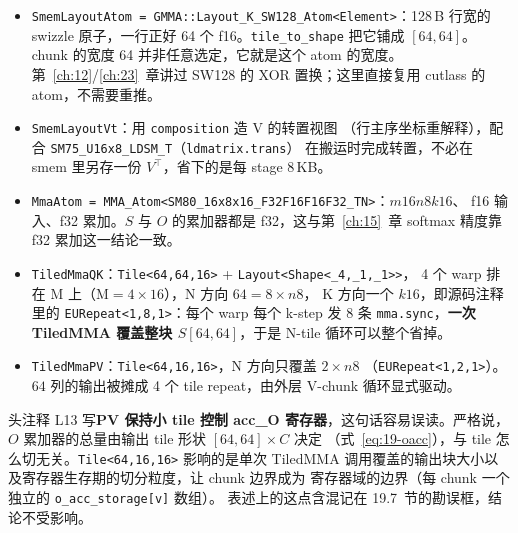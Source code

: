 \begin{itemize}[itemsep=2pt,topsep=2pt]
  \item \texttt{Smem\allowbreak{}Layout\allowbreak{}Atom =\allowbreak{} GMMA::\allowbreak{}Layout\_\allowbreak{}K\_\allowbreak{}SW128\_\allowbreak{}Atom\allowbreak{}<Element>}：128\,B
        行宽的 swizzle 原子，一行正好 64 个 f16。\texttt{tile\_\allowbreak{}to\_\allowbreak{}shape} 把它铺成
        $[64,64]$。chunk 的宽度 64 并非任意选定，它就是这个 atom 的宽度。
        第~\ref{ch:12}/\ref{ch:23}~章讲过 SW128 的 XOR 置换；这里直接复用 cutlass
        的 atom，不需要重推。
  \item \texttt{Smem\allowbreak{}Layout\allowbreak{}Vt}：用 \texttt{composition} 造 V 的转置视图
        （行主序坐标重解释），配合 \texttt{SM75\_}\allowbreak\texttt{U16x8\_}\allowbreak\texttt{LDSM\_T}（\texttt{ldmatrix.}\allowbreak\texttt{trans}）
        在搬运时完成转置，不必在 smem 里另存一份 $V^\top$，省下的是每 stage
        8\,KB。
  \item \texttt{Mma\allowbreak{}Atom =\allowbreak{} MMA\_\allowbreak{}Atom\allowbreak{}<SM80\_\allowbreak{}16x8x16\_\allowbreak{}F32\allowbreak{}F16\allowbreak{}F16\allowbreak{}F32\_\allowbreak{}TN>}：$m16n8k16$、
        f16 输入、f32 累加。$S$ 与 $O$ 的累加器都是 f32，这与第~\ref{ch:15}~章
        softmax 精度靠 f32 累加这一结论一致。
  \item \texttt{TiledMmaQK}：\texttt{Tile\allowbreak{}<64,\allowbreak{}64,\allowbreak{}16>} + \texttt{Layout\allowbreak{}<Shape\allowbreak{}<\_\allowbreak{}4,\allowbreak{}\_\allowbreak{}1,\allowbreak{}\_\allowbreak{}1>>}，
        4 个 warp 排在 M 上（$\text{M} = 4 \times 16$），N 方向 $64 = 8 \times n8$，
        K 方向一个 $k16$，即源码注释里的 \texttt{EURepeat\allowbreak{}<1,\allowbreak{}8,\allowbreak{}1>}：每个 warp 每个
        k-step 发 8 条 \texttt{mma.sync}，\textbf{一次 TiledMMA 覆盖整块
        $S[64,64]$}，于是 N-tile 循环可以整个省掉。
  \item \texttt{TiledMmaPV}：\texttt{Tile\allowbreak{}<64,\allowbreak{}16,\allowbreak{}16>}，N 方向只覆盖 $2 \times n8$
        （\texttt{EURepeat\allowbreak{}<1,\allowbreak{}2,\allowbreak{}1>}）。$64$ 列的输出被摊成 4 个 tile repeat，由外层
        V-chunk 循环显式驱动。
\end{itemize}

头注释 L13 写\textbf{PV 保持小 tile 控制 acc\_O 寄存器}，这句话容易误读。严格说，
$O$ 累加器的总量由输出 tile 形状 $[64,64]\times C$ 决定
（式~\ref{eq:19-oacc}），与 tile 怎么切无关。\texttt{Tile\allowbreak{}<64,\allowbreak{}16,\allowbreak{}16>} 影响的是单次
TiledMMA 调用覆盖的输出块大小以及寄存器生存期的切分粒度，让 chunk 边界成为
寄存器域的边界（每 chunk 一个独立的 \texttt{o\_\allowbreak{}acc\_\allowbreak{}storage[v]} 数组）。
表述上的这点含混记在 19.7~节的勘误框，结论不受影响。

